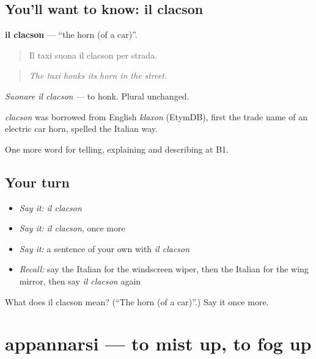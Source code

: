 \subsection*{You'll want to know: il clacson}
\textbf{il clacson} — \textquotedblleft{}the horn (of a car)\textquotedblright{}.

\begin{quote}
Il taxi suona il clacson per strada.
\end{quote}

\begin{quote}
\emph{The taxi honks its horn in the street.}
\end{quote}

\emph{Suonare il clacson} — to honk. Plural unchanged.

\begin{cousinweb}
\emph{clacson} was borrowed from English \emph{klaxon} (EtymDB), first the trade name of an electric car horn, spelled the Italian way.
\end{cousinweb}

\begin{grammarlens}[title={What you've built}]
One more word for telling, explaining and describing at B1.
\end{grammarlens}

\subsection*{Your turn}
\begin{itemize}
\raggedright
  \item \emph{Say it:} \emph{il clacson}
  \item \emph{Say it:} \emph{il clacson}, once more
  \item \emph{Say it:} a sentence of your own with \emph{il clacson}
  \item \emph{Recall:} say the Italian for the windscreen wiper, then the Italian for the wing mirror, then say \emph{il clacson} again
\end{itemize}

\begin{tcolorbox}[breakable,colback=teal!4,colframe=teal!35!black,title={Before you move on}]
What does il clacson mean? (\textquotedblleft{}The horn (of a car)\textquotedblright{}.) Say it once more.
\end{tcolorbox}
\section[appannarsi]{appannarsi — to mist up, to fog up}


